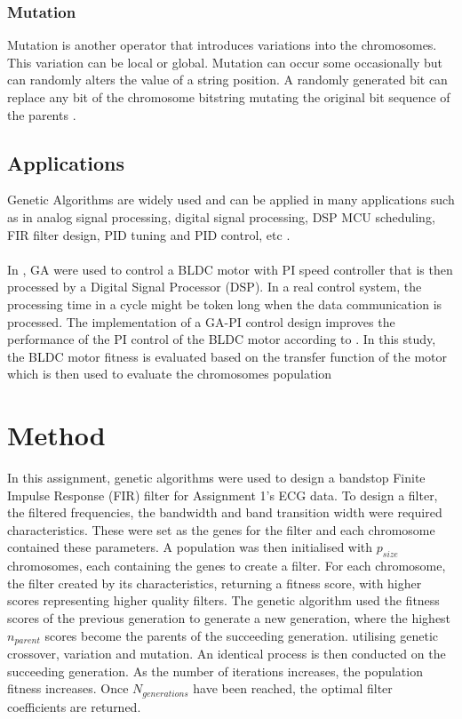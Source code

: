\documentclass[a4paper, 11pt]{article}
\begin{document}
        \subsubsection{Mutation}
            Mutation is another operator that introduces variations into the chromosomes. This variation can be
            local or global. Mutation can occur some occasionally but can randomly alters the value of a string
            position. A randomly generated bit can replace any bit of the chromosome bitstring mutating the original
            bit sequence of the parents \cite{Tang1996}.

        \subsection{Applications}
        Genetic Algorithms are widely used and can be applied in many applications such as in analog signal processing, 
        digital signal processing, DSP MCU scheduling, FIR filter design, PID tuning and PID control, etc 
        \cite{Chen2017, Fleming1993, Cao2012, Fabijanski2008, Miyata2018, Amphlett1996}.
        \\\\
        In \cite{Chen2017}, GA were used to control a BLDC motor with PI speed controller that is then processed by 
        a Digital Signal Processor (DSP). In a real control system, the processing time in a cycle might be token long
        when the data communication is processed. The implementation of a GA-PI control design improves the performance of
        the PI control of the BLDC motor according to \cite{Chen2017}. In this study, the BLDC motor fitness is evaluated
        based on the transfer function of the motor which is then used to evaluate the chromosomes population 


\section{Method}\label{sec:meth}
    In this assignment, genetic algorithms were used to design a bandstop Finite Impulse Response (FIR) filter for Assignment 1's 
    ECG data. To design a filter, the filtered frequencies, the bandwidth and band transition width  were required 
    characteristics. These were set as the genes for the filter and each chromosome contained these parameters.
    A population was then initialised with $p_{size}$ chromosomes, each containing the genes to create a filter. 
    For each chromosome, the filter created by its characteristics, returning a fitness score, with higher scores 
    representing higher quality filters. The genetic algorithm used the fitness scores of the previous generation
    to generate a new generation, where the highest $n_{parent}$ scores become the parents of the succeeding generation. 
    utilising genetic crossover, variation and mutation. An identical process is then conducted on the succeeding generation. 
    As the number of iterations increases, the population fitness increases. Once $N_{generations}$ have been reached, the
    optimal filter coefficients are returned. 
\end{document}
